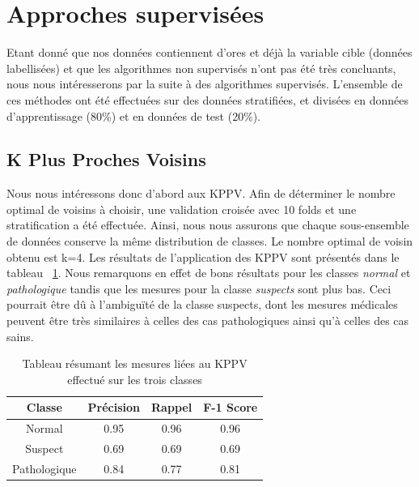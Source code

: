 \documentclass[twocolumn,10pt]{article}
\begin{document}

\section{Approches supervisées}\label{sec:sup}

Etant donné que nos données contiennent d'ores et déjà la variable cible (données labellisées) et que les algorithmes non supervisés n'ont pas été très concluants, nous nous intéresserons par la suite à des algorithmes supervisés. L'ensemble de ces méthodes ont été effectuées sur des données stratifiées, et divisées en données d'apprentissage (80\%) et en données de test (20\%).



\subsection{K Plus Proches Voisins}\label{subsec:sup:kppv}

Nous nous intéressons donc d'abord aux KPPV. Afin de déterminer le nombre optimal de voisins à choisir, une validation croisée avec 10 folds et une stratification a été effectuée. Ainsi, nous nous assurons que chaque sous-ensemble de données conserve la même distribution de classes. Le nombre optimal de voisin obtenu est k=4. Les résultats de l'application des KPPV sont présentés dans le tableau ~\ref{tab:kppv}. Nous remarquons en effet de bons résultats pour les classes \textit{normal} et \textit{pathologique} tandis que les mesures pour la classe \textit{suspects} sont plus bas. Ceci pourrait être dû à l'ambiguïté de la classe suspects, dont les mesures médicales peuvent être très similaires à celles des cas pathologiques ainsi qu'à celles des cas sains.
\begin{table}[htbp]
\begin{center}
\caption{\label{tab:kppv}Tableau résumant les mesures liées au KPPV effectué sur les trois classes}
\begin{tabular}{cccc}
\toprule
Classe & Précision & Rappel & F-1 Score \\
\midrule
Normal & 0.95 & 0.96 & 0.96 \\
Suspect & 0.69 & 0.69 & 0.69 \\
Pathologique & 0.84 & 0.77 & 0.81 \\ 
\bottomrule
\end{tabular}
\end{center}
\end{table}
\end{document}
